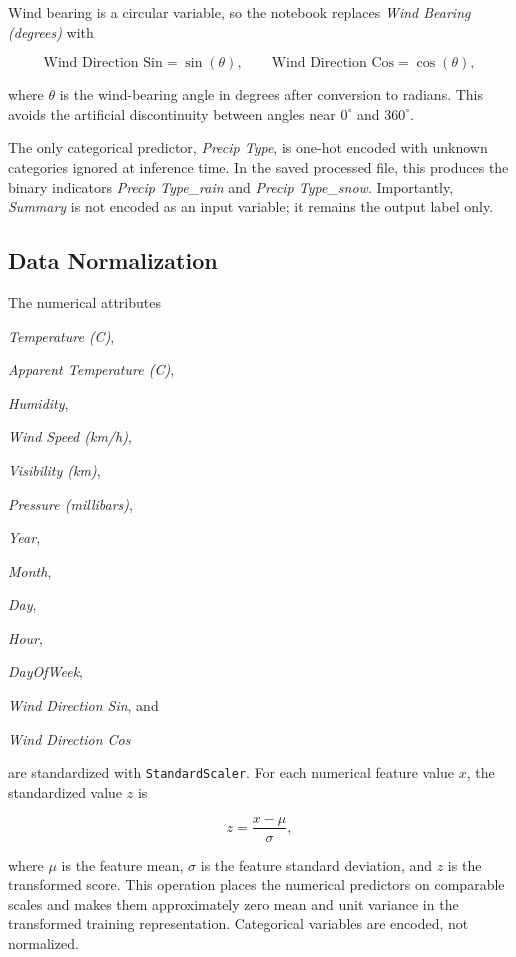 \documentclass[10pt,letterpaper,twocolumn]{article}
\begin{document}
Wind bearing is a circular variable, so the notebook replaces \textit{Wind Bearing (degrees)} with

\begin{equation}
\text{Wind Direction Sin}
=
\sin(\theta),
\qquad
\text{Wind Direction Cos}
=
\cos(\theta),
\end{equation}

where $\theta$ is the wind-bearing angle in degrees after conversion to radians. This avoids the artificial discontinuity between angles near $0^\circ$ and $360^\circ$.

The only categorical predictor, \textit{Precip Type}, is one-hot encoded with unknown categories ignored at inference time. In the saved processed file, this produces the binary indicators \textit{Precip Type\_rain} and \textit{Precip Type\_snow}. Importantly, \textit{Summary} is not encoded as an input variable; it remains the output label only.

\subsection{Data Normalization}

The numerical attributes

\textit{Temperature (C)},

\textit{Apparent Temperature (C)},

\textit{Humidity},

\textit{Wind Speed (km/h)},

\textit{Visibility (km)},

\textit{Pressure (millibars)},

\textit{Year},

\textit{Month},

\textit{Day},

\textit{Hour},

\textit{DayOfWeek},

\textit{Wind Direction Sin}, and

\textit{Wind Direction Cos}

are standardized with \texttt{StandardScaler}. For each numerical feature value $x$, the standardized value $z$ is

\begin{equation}
z = \frac{x-\mu}{\sigma},
\end{equation}

where $\mu$ is the feature mean, $\sigma$ is the feature standard deviation, and $z$ is the transformed score. This operation places the numerical predictors on comparable scales and makes them approximately zero mean and unit variance in the transformed training representation. Categorical variables are encoded, not normalized.
\end{document}
